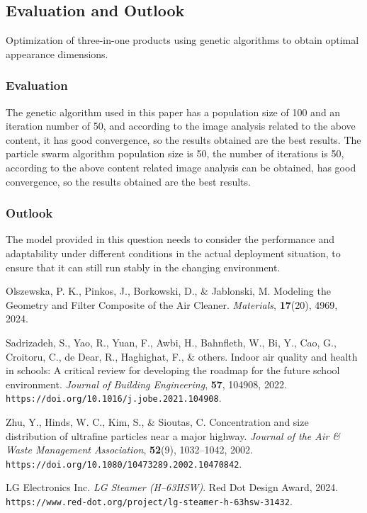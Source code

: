 \documentclass{apmcmthesis}
\begin{document}
\subsection{Evaluation and Outlook}
Optimization of three-in-one products using genetic algorithms to obtain optimal appearance dimensions.
\subsubsection{Evaluation}
The genetic algorithm used in this paper has a population size of 100 and an iteration number of 50, and according to the image analysis related to the above content, it has good convergence, so the results obtained are the best results. The particle swarm algorithm population size is 50, the number of iterations is 50, according to the above content related image analysis can be obtained, has good convergence, so the results obtained are the best results.
\subsubsection{Outlook}
The model provided in this question needs to consider the performance and adaptability under different conditions in the actual deployment situation, to ensure that it can still run stably in the changing environment.


\begin{thebibliography}{9}%
Olszewska, P. K., Pinkos, J., Borkowski, D., \& Jablonski, M. 
Modeling the Geometry and Filter Composite of the Air Cleaner. 
\textit{Materials}, \textbf{17}(20), 4969, 2024.

Sadrizadeh, S., Yao, R., Yuan, F., Awbi, H., Bahnfleth, W., Bi, Y., Cao, G., Croitoru, C., de Dear, R., Haghighat, F., \& others. 
Indoor air quality and health in schools: A critical review for developing the roadmap for the future school environment. 
\textit{Journal of Building Engineering}, \textbf{57}, 104908, 2022. 
\texttt{https://doi.org/10.1016/j.jobe.2021.104908}.

Zhu, Y., Hinds, W. C., Kim, S., \& Sioutas, C. 
Concentration and size distribution of ultrafine particles near a major highway. 
\textit{Journal of the Air \& Waste Management Association}, \textbf{52}(9), 1032--1042, 2002. 
\texttt{https://doi.org/10.1080/10473289.2002.10470842}.

LG Electronics Inc. 
\textit{LG Steamer (H–63HSW)}. 
Red Dot Design Award, 2024. 
\texttt{https://www.red-dot.org/project/lg-steamer-h-63hsw-31432}.

\end{thebibliography}
\end{document}
